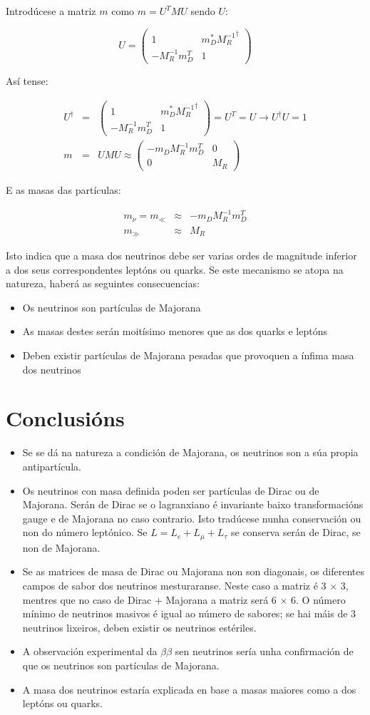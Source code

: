 \documentclass[a4paper,10pt]{article}
\newcommand{\beq}{\begin{equation}}
\newcommand{\eeq}{\end{equation}}
\newcommand{\bea}{\begin{eqnarray}}
\newcommand{\eea}{\end{eqnarray}}
\newcommand{\bi}{\begin{itemize}}
\newcommand{\ei}{\end{itemize}}
\newcommand{\bmx}{\left(\begin{array}}
\newcommand{\emx}{\end{array}\right)}
\newcommand{\h}[1]{#1^\dagger}
\begin{document}
Introdúcese a matriz $m$ como $m = U^T M U$ sendo $U$:

\beq
U = \bmx{cc} 1 & m_D^* {M_R^{-1}}^\dag \\ - M_R^{-1} m_D^T & 1 \emx
\eeq

Así tense:

\bea
\h U &=& \bmx{cc} 1 & m_D^* {M_R^{-1}}^\dag \\ - M_R^{-1} m_D^T & 1 \emx = U^T = U \rightarrow \h U U = 1 \\
m &=& U M U \approx \bmx{cc} -m_D M_R^{-1} m_D^T & 0 \\ 0 & M_R \emx
\eea

E as masas das partículas:

\bea
m_\nu = m_\ll &\approx& - m_D M_R^{-1} m_D^T \\
m_\gg &\approx& M_R
\eea

Isto indica que a masa dos neutrinos debe ser varias ordes de magnitude inferior a dos seus correspondentes leptóns ou quarks. Se este mecanismo se atopa na natureza, haberá as seguintes consecuencias:

\bi

\item Os neutrinos son partículas de Majorana

\item As masas destes serán moitísimo menores que as dos quarks e leptóns

\item Deben existir partículas de Majorana pesadas que provoquen a ínfima masa dos neutrinos

\ei

\section{Conclusións}

\bi
\item Se se dá na natureza a condición de Majorana, os neutrinos son a súa propia antipartícula.
\item Os neutrinos con masa definida poden ser partículas de Dirac ou de Majorana. Serán de Dirac se o lagranxiano é invariante baixo transformacións gauge e de Majorana no caso contrario. Isto tradúcese nunha conservación ou non do número leptónico. Se $L = L_e + L_\mu + L_\tau$ se conserva serán de Dirac, se non de Majorana.
\item Se as matrices de masa de Dirac ou Majorana non son diagonais, os diferentes campos de sabor dos neutrinos mesturaranse. Neste caso a matriz é $ 3 \, \times \, 3$, mentres que no caso de Dirac + Majorana a matriz será $ 6 \, \times \, 6$. O número mínimo de neutrinos masivos é igual ao número de sabores; se hai máis de 3 neutrinos lixeiros, deben existir os neutrinos estériles.
\item A observación experimental da $\beta\beta$ sen neutrinos sería unha confirmación de que os neutrinos son partículas de Majorana.
\item A masa dos neutrinos estaría explicada en base a masas maiores como a dos leptóns ou quarks.
\ei
\end{document}
